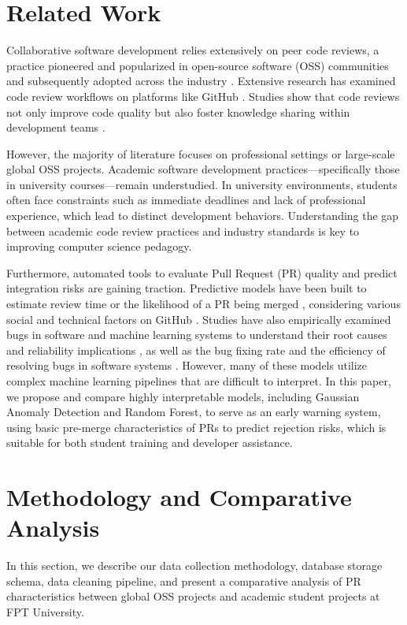 \documentclass[conference]{IEEEtran}
\begin{document}
\section{Related Work}
Collaborative software development relies extensively on peer code reviews, a practice pioneered and popularized in open-source software (OSS) communities and subsequently adopted across the industry \cite{b2}. Extensive research has examined code review workflows on platforms like GitHub \cite{b1}. Studies show that code reviews not only improve code quality but also foster knowledge sharing within development teams \cite{b2}.

However, the majority of literature focuses on professional settings or large-scale global OSS projects. Academic software development practices—specifically those in university courses—remain understudied. In university environments, students often face constraints such as immediate deadlines and lack of professional experience, which lead to distinct development behaviors. Understanding the gap between academic code review practices and industry standards is key to improving computer science pedagogy.

Furthermore, automated tools to evaluate Pull Request (PR) quality and predict integration risks are gaining traction. Predictive models have been built to estimate review time or the likelihood of a PR being merged \cite{b6}, considering various social and technical factors on GitHub \cite{b6}. Studies have also empirically examined bugs in software and machine learning systems to understand their root causes and reliability implications \cite{b4}, as well as the bug fixing rate and the efficiency of resolving bugs in software systems \cite{b8}. However, many of these models utilize complex machine learning pipelines that are difficult to interpret. In this paper, we propose and compare highly interpretable models, including Gaussian Anomaly Detection and Random Forest, to serve as an early warning system, using basic pre-merge characteristics of PRs to predict rejection risks, which is suitable for both student training and developer assistance.

\section{Methodology and Comparative Analysis}
In this section, we describe our data collection methodology, database storage schema, data cleaning pipeline, and present a comparative analysis of PR characteristics between global OSS projects and academic student projects at FPT University.
\end{document}
